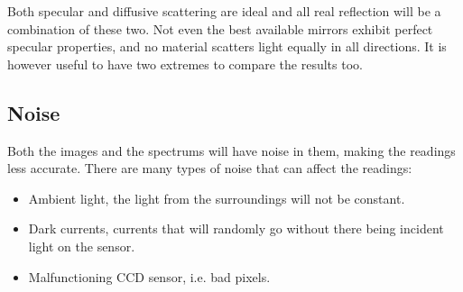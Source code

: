 Both specular and diffusive scattering are ideal and all real reflection will be a combination of these two. Not even the best available mirrors exhibit perfect specular properties, and no material scatters light equally in all directions. It is however useful to have two extremes to compare the results too. 


\subsection{Noise}
\label{sec:noise_and_dark_current}
Both the images and the spectrums will have noise in them, making the readings less accurate. There are many types of noise that can affect the readings: 
\begin{itemize}
    \item Ambient light, the light from the surroundings will not be constant.
    \item Dark currents, currents that will randomly go without there being incident light on the sensor.
    \item Malfunctioning CCD sensor, i.e. bad pixels. 
\end{itemize}




% 